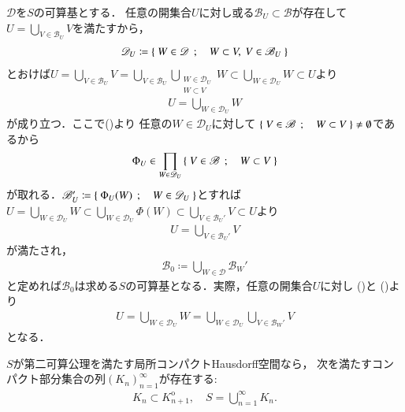 	\begin{prf}
		$\mathscr{D}$を$S$の可算基とする．
		任意の開集合$U$に対し或る$\mathscr{B}_U \subset \mathscr{B}$が存在して
		$U = \bigcup_{V \in \mathscr{B}_U}V$を満たすから，
		\begin{align}
			\mathscr{D}_U \coloneqq
			\left\{\ W \in \mathscr{D}\ \, ; \quad W \subset V,\ V \in \mathscr{B}_U\ \right\}
			\label{eq:thm_countable_base_of_second_countable_space_1}
		\end{align}
		とおけば$U = \bigcup_{V \in \mathscr{B}_U} V
			= \bigcup_{V \in \mathscr{B}_U} \bigcup_{\substack{W \in \mathscr{D}_U \\ W \subset V}} W
			\subset \bigcup_{W \in \mathscr{D}_U} W
			\subset U$より
		\begin{align}
			U = \bigcup_{W \in \mathscr{D}_U} W
			\label{eq:thm_countable_base_of_second_countable_space_2}
		\end{align}
		が成り立つ．ここで()より
		任意の$W \in \mathscr{D}_U$に対して
		$\left\{\ V \in \mathscr{B}\ \, ; \quad W \subset V\ \right\} \neq \emptyset$であるから
		\begin{align}
			\Phi_U \in \prod_{W \in \mathscr{D}_U} \left\{\ V \in \mathscr{B}\ \, ; \quad W \subset V\ \right\}
		\end{align}
		が取れる．$\mathscr{B}_U' \coloneqq \left\{\ \Phi_U(W)\ \, ; \quad W \in \mathscr{D}_U\ \right\}$とすれば
		$U = \bigcup_{W \in \mathscr{D}_U} W \subset \bigcup_{W \in \mathscr{D}_U} \Phi(W)
		\subset \bigcup_{V \in \mathscr{B}_U'} V \subset U$より
		\begin{align}
			U = \bigcup_{V \in \mathscr{B}_U'} V
			\label{eq:thm_countable_base_of_second_countable_space_3}
		\end{align}
		が満たされ，
		\begin{align}
			\mathscr{B}_0 \coloneqq \bigcup_{W \in \mathscr{D}} \mathscr{B}_W'
		\end{align}
		と定めれば$\mathscr{B}_0$は求める$S$の可算基となる．実際，任意の開集合$U$に対し
		()と
		()より
		\begin{align}
			U = \bigcup_{W \in \mathscr{D}_U} W
			= \bigcup_{W \in \mathscr{D}_U} \bigcup_{V \in \mathscr{B}_W'} V
		\end{align}
		となる．
		\QED
	\end{prf}
	
	\begin{screen}
		\begin{thm}\label{thm:second_countable_Hausdorff_sigma_compact}
			$S$が第二可算公理を満たす局所コンパクトHausdorff空間なら，
			次を満たすコンパクト部分集合の列$(K_n)_{n=1}^\infty$が存在する:
			\begin{align}
				K_n \subset K_{n+1}^{\mathrm{o}},
				\quad S = \bigcup_{n=1}^\infty K_n.
			\end{align}
		\end{thm}
	\end{screen}
	
